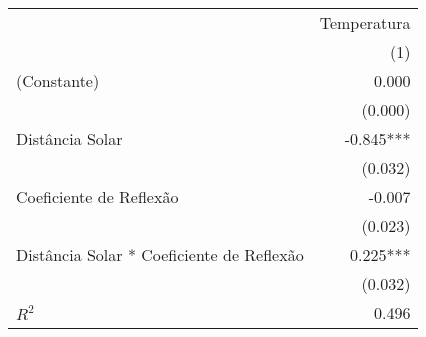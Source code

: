 \begin{tabular}{lr}
\toprule
                                          & \multicolumn{1}{c}{Temperatura} \\ 
\cmidrule(lr){2-2} 
                                          &                             (1) \\ 
\midrule
(Constante)                               &                           0.000 \\ 
                                          &                         (0.000) \\ 
Distância Solar                           &                       -0.845*** \\ 
                                          &                         (0.032) \\ 
Coeficiente de Reflexão                   &                          -0.007 \\ 
                                          &                         (0.023) \\ 
Distância Solar * Coeficiente de Reflexão &                        0.225*** \\ 
                                          &                         (0.032) \\ 
\midrule
$R^2$                                     &                           0.496 \\ 
\bottomrule
\end{tabular}
